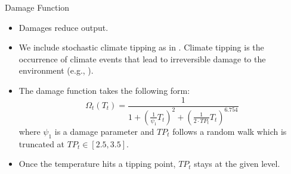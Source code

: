 \documentclass[aspectratio=1610]{beamer}
\newcommand{\blup}[1]{\textcolor{uzhgreydark}{#1}}
\let\citeOld\cite %
\renewcommand{\cite}[1]{{\blup{\citeOld{#1}}}}
\begin{document}
\begin{frame}[fragile]{Damage Function}
\begin{small}

\begin{itemize}
    \item Damages reduce output. 
    \item We include stochastic climate tipping as in \cite{weitzman2012ghg,kotlikoffParetoimprovingCarbonriskTaxation2021a}. Climate tipping is the occurrence of climate events that lead to irreversible damage to the environment (e.g., \citealp{lenton2008tipping}).
    \item The damage function takes the following form:
    \begin{equation}
        \label{eq:damage_func_tipping}
    \Omega_t \left( T_{ t} \right) =  \frac{1}{1 + \left(\frac{1}{\psi_1} T_{ t} \right)^{2} + \left( \frac{1}{2 \cdot TP_{t}} T_{ t} \right)^{6.754}}
    \end{equation}
where $\psi_1$ is a damage parameter and $TP_t$ follows a random walk which is truncated at $TP_t \in [2.5, 3.5]$. 

\item Once the temperature hits a tipping point, $TP_t$ stays at the given level.

\end{itemize}



\end{small}
\end{frame}
\end{document}

